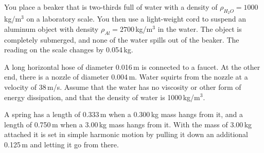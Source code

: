 \documentclass[letterpaper,addpoints,answers]{exam}
\begin{document}
\begin{questions}
\pagebreak

\question
You place a beaker that is two-thirds full of water with a density of $\rho_{H_2O} = 1000$\,kg/m$^3$ on a laboratory scale. You then use a light-weight cord to suspend an aluminum object with density $\rho_{Al} = 2700$\,kg/m$^3$ in the water. The object is completely submerged, and none of the water spills out of the beaker. The reading on the scale changes by 0.054\,kg.

\question
A long horizontal hose of diameter 0.016\,m is connected to a faucet. At the other end, there is a nozzle of diameter 0.004\,m. Water squirts from the nozzle at a velocity of 38\,m/s. Assume that the water has no viscosity or other form of energy dissipation, and that the density of water is 1000\,kg/m$^3$.

\pagebreak

\question
A spring has a length of 0.333\,m when a 0.300\,kg mass hangs from it, and a length of 0.750\,m when a 3.00\,kg mass hangs from it.  With the mass of 3.00\,kg attached it is set in simple harmonic motion by pulling it down an additional 0.125\,m and letting it go from there.
\begin{parts}

\end{parts}
\end{questions}
\end{document}
